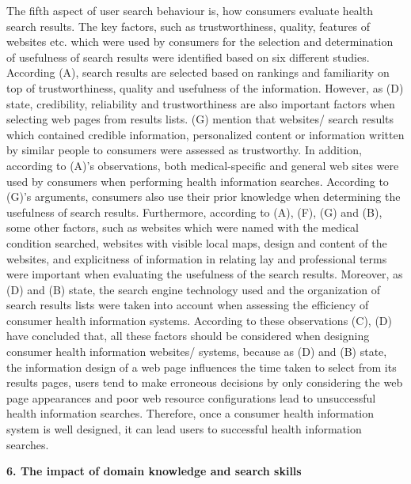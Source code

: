 \documentclass[]{article}
\begin{document}
The fifth aspect of user search behaviour is, how consumers evaluate health search results. The key factors, such as trustworthiness, quality, features of websites etc. which were used by consumers for the selection and determination of usefulness of search results were identified based on six different studies. According (A), search results are selected based on rankings and familiarity on top of trustworthiness, quality and usefulness of the information. However, as (D) state, credibility, reliability and trustworthiness are also important factors when selecting web pages from results lists. (G) mention that websites/ search results which contained credible information, personalized content or information written by similar people to consumers were assessed as trustworthy. In addition, according to (A)'s observations, both medical-specific and general web sites were used by consumers when performing health information searches. According to (G)'s arguments, consumers also use their prior knowledge when determining the usefulness of search results. Furthermore, according to (A), (F), (G) and (B), some other factors, such as websites which were named with the medical condition searched, websites with visible local maps, design and content of the websites, and explicitness of information in relating lay and professional terms were important when evaluating the usefulness of the search results. Moreover, as (D) and (B) state, the search engine technology used and the organization of search results lists were taken into account when assessing the efficiency of consumer health information systems. According to these observations (C), (D) have concluded that, all these factors should be considered when designing consumer health information websites/ systems, because as (D) and (B) state, the information design of a web page influences the time taken to select from its results pages, users tend to make erroneous decisions by only considering the web page appearances and poor web resource configurations lead to unsuccessful health information searches. Therefore, once a consumer health information system is well designed, it can lead users to successful health information searches. 

\textbf{6. The impact of domain knowledge and search skills}
\end{document}
